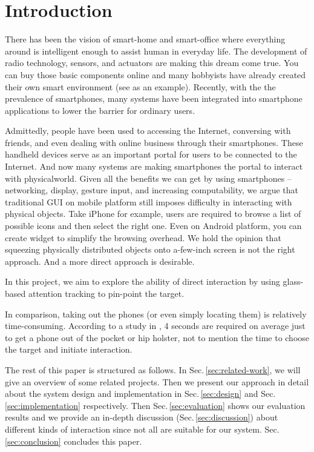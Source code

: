 \section{Introduction}
\label{sec:introduction}

There has been the vision of smart-home and smart-office where everything around is intelligent enough to assist human in everyday life. The development of radio technology, sensors, and actuators are making this dream come true. You can buy those basic components online \cite{SmartHome, NinjaBlocks} and many hobbyists have already created their own smart environment (see \cite{BRAD} as an example). Recently, with the the prevalence of smartphones, many systems \cite{SmartThings, Lockitron} have been integrated into smartphone applications to lower the barrier for ordinary users.

Admittedly, people have been used to accessing the Internet, conversing with friends, and even dealing with online business through their smartphones. These handheld devices serve as an important portal for users to be connected to the Internet. And now many systems are making smartphones the portal to interact with physicalworld. Given all the benefits we can get by using smartphones -- networking,  display, gesture input, and increasing computability,  we argue that traditional GUI on mobile platform still imposes difficulty in interacting with physical objects. Take iPhone for example, users are required to browse a list of possible icons and then select the right one. Even on Android platform, you can create widget to simplify the browsing overhead. We hold the opinion that squeezing physically distributed objects onto a-few-inch screen is not the right approach. And a more direct approach is desirable.

In this project, we aim to explore the ability of direct interaction by using glass-based attention tracking to pin-point the target. 


In comparison, taking out the phones (or even simply locating them) is relatively time-consuming. According to a study in \cite{Ashbrook:2008:QIM:1357054.1357092}, 4 seconds are required on average just to get a phone out of the pocket or hip holster, not to mention the time to choose the target and initiate interaction. 


The rest of this paper is structured as follows. In Sec.\,\ref{sec:related-work}, we will give an overview of some related projects. Then we present our approach in detail about the system design and implementation in Sec.\,\ref{sec:design} and Sec.\,\ref{sec:implementation} respectively. Then Sec.\,\ref{sec:evaluation} shows our evaluation results and we provide an in-depth discussion (Sec.\,\ref{sec:discussion}) about different kinds of interaction since not all are suitable for our system. Sec.\,\ref{sec:conclusion} concludes this paper.


